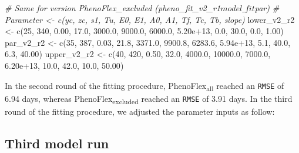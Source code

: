 \documentclass[
]{article}
\newenvironment{Shaded}{\begin{snugshade}}{\end{snugshade}}
\newcommand{\CommentTok}[1]{\textcolor[rgb]{0.56,0.35,0.01}{\textit{#1}}}
\newcommand{\DecValTok}[1]{\textcolor[rgb]{0.00,0.00,0.81}{#1}}
\newcommand{\FloatTok}[1]{\textcolor[rgb]{0.00,0.00,0.81}{#1}}
\newcommand{\FunctionTok}[1]{\textcolor[rgb]{0.00,0.00,0.00}{#1}}
\newcommand{\NormalTok}[1]{#1}
\newcommand{\OtherTok}[1]{\textcolor[rgb]{0.56,0.35,0.01}{#1}}
\begin{document}
\begin{Shaded}
\begin{Highlighting}[]
\CommentTok{\# Same for version PhenoFlex\_excluded (pheno\_fit\_v2\_r1$model\_fit$par)}
\CommentTok{\# Parameter \textless{}{-} c(yc,  zc,   s1,   Tu,     E0,      E1,     A0,       A1,   Tf,   Tc,   Tb, slope)}
\NormalTok{lower\_v2\_r2 }\OtherTok{\textless{}{-}} \FunctionTok{c}\NormalTok{(}\DecValTok{25}\NormalTok{, }\DecValTok{340}\NormalTok{, }\FloatTok{0.00}\NormalTok{, }\FloatTok{17.0}\NormalTok{, }\FloatTok{3000.0}\NormalTok{,  }\FloatTok{9000.0}\NormalTok{, }\FloatTok{6000.0}\NormalTok{, }\FloatTok{5.20e+13}\NormalTok{,  }\FloatTok{0.0}\NormalTok{, }\FloatTok{30.0}\NormalTok{,  }\FloatTok{0.0}\NormalTok{,  }\FloatTok{1.00}\NormalTok{)}
\NormalTok{par\_v2\_r2   }\OtherTok{\textless{}{-}} \FunctionTok{c}\NormalTok{(}\DecValTok{35}\NormalTok{, }\DecValTok{387}\NormalTok{, }\FloatTok{0.03}\NormalTok{, }\FloatTok{21.8}\NormalTok{, }\FloatTok{3371.0}\NormalTok{,  }\FloatTok{9900.8}\NormalTok{, }\FloatTok{6283.6}\NormalTok{, }\FloatTok{5.94e+13}\NormalTok{,  }\FloatTok{5.1}\NormalTok{, }\FloatTok{40.0}\NormalTok{,  }\FloatTok{6.3}\NormalTok{, }\FloatTok{40.00}\NormalTok{)}
\NormalTok{upper\_v2\_r2 }\OtherTok{\textless{}{-}} \FunctionTok{c}\NormalTok{(}\DecValTok{40}\NormalTok{, }\DecValTok{420}\NormalTok{, }\FloatTok{0.50}\NormalTok{, }\FloatTok{32.0}\NormalTok{, }\FloatTok{4000.0}\NormalTok{, }\FloatTok{10000.0}\NormalTok{, }\FloatTok{7000.0}\NormalTok{, }\FloatTok{6.20e+13}\NormalTok{, }\FloatTok{10.0}\NormalTok{, }\FloatTok{42.0}\NormalTok{, }\FloatTok{10.0}\NormalTok{, }\FloatTok{50.00}\NormalTok{)}
\end{Highlighting}
\end{Shaded}

In the second round of the fitting procedure,
PhenoFlex\textsubscript{all} reached an \texttt{RMSE} of 6.94 days,
whereas PhenoFlex\textsubscript{excluded} reached an \texttt{RMSE} of
3.91 days. In the third round of the fitting procedure, we adjusted the
parameter inputs as follow:

\hypertarget{third-model-run}{%
\subsection{Third model run}\label{third-model-run}}
\end{document}
